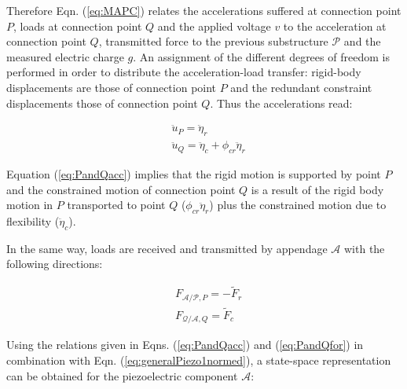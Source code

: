 \documentclass{ifacconf}
\begin{document}
Therefore Eqn. (\ref{eq:MAPC}) relates the accelerations suffered at connection point $P$, loads at connection point $Q$ and the applied voltage $v$ to the acceleration at connection point $Q$, transmitted force to the previous substructure $\mathcal{P}$ and the measured electric charge $g$. An assignment of the different degrees of freedom is performed in order to distribute the acceleration-load transfer: rigid-body displacements are those of connection point $P$ and the redundant constraint displacements those of connection point $Q$. Thus the accelerations read:

\begin{equation}
\label{eq:PandQacc}
\begin{split}
& \ddot{u}_P = \ddot{\eta}_r \\ 
&\ddot{u}_Q = \ddot{\eta}_c + \phi_{cr}\ddot{\eta}_r
\end{split}
\end{equation}

Equation (\ref{eq:PandQacc}) implies that the rigid motion is supported by point $P$ and the constrained motion of connection point $Q$ is a result of the rigid body motion in $P$ transported to point $Q$ ($\phi_{cr}\ddot{\eta}_r$) plus the constrained motion due to flexibility ($\ddot{\eta}_c$).

In the same way, loads are received and transmitted by appendage $\mathcal{A}$ with the following directions:

\begin{equation}
\label{eq:PandQfor}
\begin{split}
&F_{\mathcal{A}/\mathcal{P},P}  = - \tilde{F}_r   \\
& F_{\mathcal{Q}/\mathcal{A},Q} =   \tilde{F}_c  
\end{split}
\end{equation}


Using the relations given in Eqns. (\ref{eq:PandQacc}) and (\ref{eq:PandQfor}) in combination with Eqn. (\ref{eq:generalPiezo1normed}), a state-space representation can be obtained for the piezoelectric component $\mathcal{A}$: 
\end{document}
